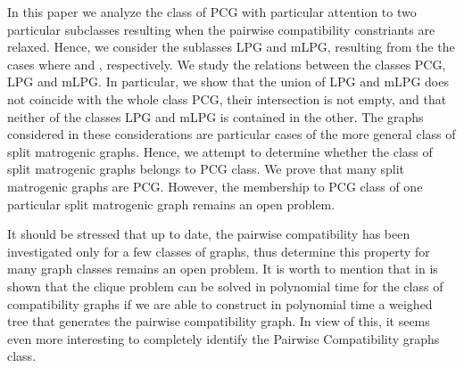 \documentclass[dvipdfm]{llncs}
\begin{document}
In this paper we analyze the class of PCG with particular attention to two particular subclasses resulting when the pairwise compatibility constriants are relaxed. Hence, we consider the sublasses LPG and mLPG, resulting from the the cases where  and , respectively. We study the relations between the classes PCG, LPG and mLPG. In particular, we show that the union of LPG and mLPG does not coincide with the whole class PCG, their intersection is not empty, and that neither of the classes LPG and mLPG is contained in the other.  The graphs considered in these considerations are particular cases of the more general class of split matrogenic graphs. Hence,  we attempt to determine whether the class of split  matrogenic graphs belongs to PCG class. We prove that many split matrogenic graphs are PCG. However, the membership to PCG class of one particular split matrogenic graph remains an open problem.  

It should be stressed that up to date, the pairwise compatibility has been investigated only for a few classes of graphs, thus determine this property for many graph classes remains an open problem.  It is worth to mention that in \cite{Kal03} is shown that the clique problem can be solved in polynomial time for the class of compatibility graphs if we are able to construct in polynomial time a weighed tree that generates the pairwise compatibility graph.  In view of this, it seems even more interesting to completely identify the Pairwise Compatibility graphs class.  
\end{document}
